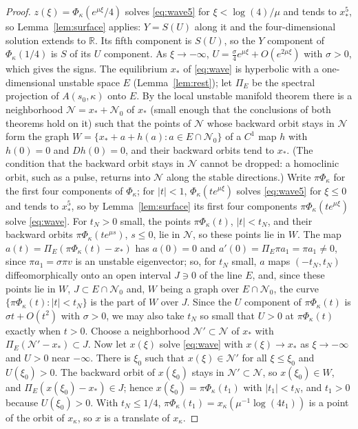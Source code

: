 \documentclass[11pt]{article}
\theoremstyle{definition}
\newcommand{\R}{\mathbb{R}}
\newcommand{\xs}{x_*}
\begin{document}
\begin{proof}
$z(\xi) = \Phi_\kappa(e^{\mu\xi}/4)$ solves \eqref{eq:wave5} for $\xi < \log(4)/\mu$ and tends to $\xs^5$, so Lemma~\ref{lem:surface} applies: $Y = S(U)$ along it and the four-dimensional solution extends to $\R$. Its fifth component is $S(U)$, so the $Y$ component of $\Phi_\kappa(1/4)$ is $S$ of its $U$ component. As $\xi \to -\infty$, $U = \frac{\sigma}{4}e^{\mu\xi} + O(e^{2\mu\xi})$ with $\sigma > 0$, which gives the signs. The equilibrium $\xs$ of \eqref{eq:wave} is hyperbolic with a one-dimensional unstable space $E$ (Lemma~\ref{lem:rest}); let $\Pi_E$ be the spectral projection of $A(s_0, \kappa)$ onto $E$. By the local unstable manifold theorem \cite[Theorems~9.4 and~9.5, the unstable case]{teschl2012} there is a neighborhood $\mathcal{N} = \xs + \mathcal{N}_0$ of $\xs$ (small enough that the conclusions of both theorems hold on it) such that the points of $\mathcal{N}$ whose backward orbit stays in $\mathcal{N}$ form the graph $W = \{\xs + a + h(a) : a \in E \cap \mathcal{N}_0\}$ of a $C^1$ map $h$ with $h(0) = 0$ and $Dh(0) = 0$, and their backward orbits tend to $\xs$. (The condition that the backward orbit stays in $\mathcal{N}$ cannot be dropped: a homoclinic orbit, such as a pulse, returns into $\mathcal{N}$ along the stable directions.) Write $\pi\Phi_\kappa$ for the first four components of $\Phi_\kappa$; for $|t| < 1$, $\Phi_\kappa(te^{\mu\xi})$ solves \eqref{eq:wave5} for $\xi \le 0$ and tends to $\xs^5$, so by Lemma~\ref{lem:surface} its first four components $\pi\Phi_\kappa(te^{\mu\xi})$ solve \eqref{eq:wave}. For $t_N > 0$ small, the points $\pi\Phi_\kappa(t)$, $|t| < t_N$, and their backward orbits $\pi\Phi_\kappa(te^{\mu s})$, $s \le 0$, lie in $\mathcal{N}$, so these points lie in $W$. The map $a(t) = \Pi_E(\pi\Phi_\kappa(t) - \xs)$ has $a(0) = 0$ and $a'(0) = \Pi_E\pi a_1 = \pi a_1 \ne 0$, since $\pi a_1 = \sigma\pi v$ is an unstable eigenvector; so, for $t_N$ small, $a$ maps $(-t_N, t_N)$ diffeomorphically onto an open interval $J \ni 0$ of the line $E$, and, since these points lie in $W$, $J \subset E \cap \mathcal{N}_0$ and, $W$ being a graph over $E \cap \mathcal{N}_0$, the curve $\{\pi\Phi_\kappa(t) : |t| < t_N\}$ is the part of $W$ over $J$. Since the $U$ component of $\pi\Phi_\kappa(t)$ is $\sigma t + O(t^2)$ with $\sigma > 0$, we may also take $t_N$ so small that $U > 0$ at $\pi\Phi_\kappa(t)$ exactly when $t > 0$. Choose a neighborhood $\mathcal{N}' \subset \mathcal{N}$ of $\xs$ with $\Pi_E(\mathcal{N}' - \xs) \subset J$. Now let $x(\xi)$ solve \eqref{eq:wave} with $x(\xi) \to \xs$ as $\xi \to -\infty$ and $U > 0$ near $-\infty$. There is $\xi_0$ such that $x(\xi) \in \mathcal{N}'$ for all $\xi \le \xi_0$ and $U(\xi_0) > 0$. The backward orbit of $x(\xi_0)$ stays in $\mathcal{N}' \subset \mathcal{N}$, so $x(\xi_0) \in W$, and $\Pi_E(x(\xi_0) - \xs) \in J$; hence $x(\xi_0) = \pi\Phi_\kappa(t_1)$ with $|t_1| < t_N$, and $t_1 > 0$ because $U(\xi_0) > 0$. With $t_N \le 1/4$, $\pi\Phi_\kappa(t_1) = x_\kappa(\mu^{-1}\log(4t_1))$ is a point of the orbit of $x_\kappa$, so $x$ is a translate of $x_\kappa$.
\end{proof}
\end{document}
